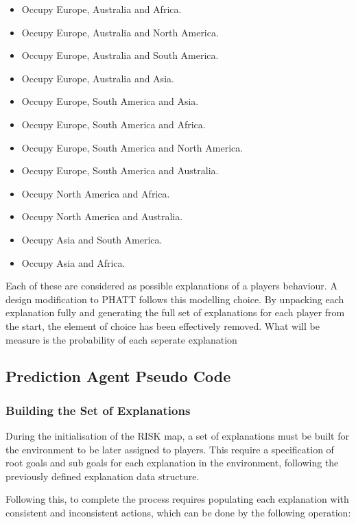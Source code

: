 \documentclass[parskip]{cs4rep}
\begin{document}
\begin{itemize}
\item
Occupy Europe, Australia and Africa.
\item
Occupy Europe, Australia and North America.
\item
Occupy Europe, Australia and South America.
\item
Occupy Europe, Australia and Asia.
\item
Occupy Europe, South America and Asia.
\item
Occupy Europe, South America and Africa.
\item
Occupy Europe, South America and North America.
\item
Occupy Europe, South America and Australia.
\item
Occupy North America and Africa.
\item
Occupy North America and Australia.
\item
Occupy Asia and South America.
\item
Occupy Asia and Africa.
\end{itemize}

Each of these are considered as possible explanations of a players behaviour. A design modification to PHATT follows this modelling choice. By unpacking each explanation fully and generating the full set of explanations for each player from the start, the element of choice has been effectively removed. What will be measure is the probability of each seperate explanation 

\subsection{Prediction Agent Pseudo Code}

\subsubsection{Building the Set of Explanations}

During the initialisation of the RISK map, a set of explanations must be built for the environment to be later assigned to players. This require a specification of root goals and sub goals for each explanation in the environment, following the previously defined explanation data structure.

Following this, to complete the process requires populating each explanation with consistent and inconsistent actions, which can be done by the following operation: 
\end{document}
